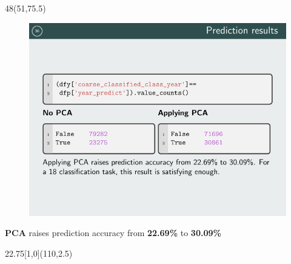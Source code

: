 \documentclass[hyperref={pdfpagelabels=false}]{beamer}
\begin{document}
\begin{frame}
\begin{textblock}{48}(51,75.5)
\begin{basebox}[title=Year Prediction, opacitybacktitle=.45,colbacktitle=green!10, colframe=grey!65!black, halign title=left]

\begin{figure}
    \centering
    \includegraphics[width=\textwidth]{pdf/p36.pdf}
\end{figure}

\textbf{PCA} raises prediction accuracy from \textbf{22.69\%} to \textbf{30.09\%}


\end{basebox}
\end{textblock}

%
%

\begin{textblock}{22.75}[1,0](110,2.5)
	\logos[light]
\end{textblock}

\end{frame}
\end{document}
